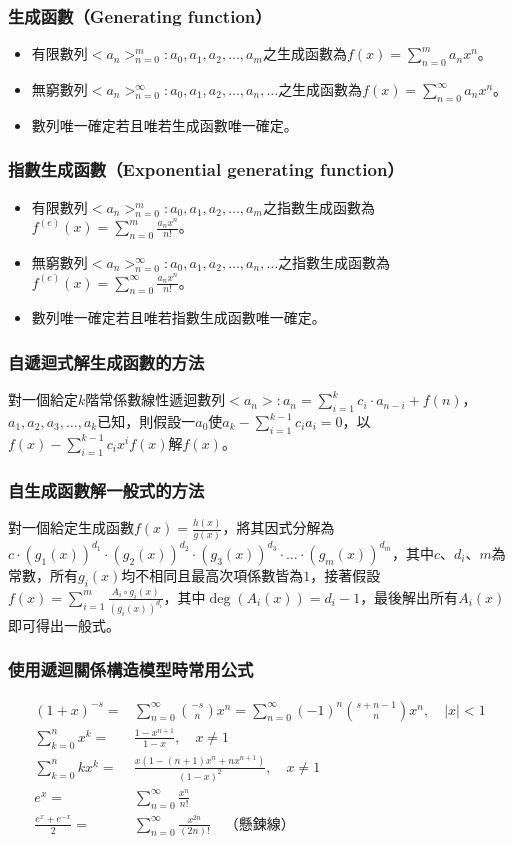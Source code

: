 \documentclass[a4paper,12pt]{article}
\begin{document}
\subsubsection{生成函數（Generating function）}
\begin{itemize}
\item 有限數列$<a_n>_{n=0}^m: a_0, a_1, a_2, \ldots, a_m$之生成函數為$f(x)=\sum_{n=0}^m a_n x^n$。
\item 無窮數列$<a_n>_{n=0}^\infty: a_0, a_1, a_2, \ldots, a_n, \ldots$之生成函數為$f(x)=\sum_{n=0}^\infty a_n x^n$。
\item 數列唯一確定若且唯若生成函數唯一確定。
\end{itemize}
\subsubsection{指數生成函數（Exponential generating function）}
\begin{itemize}
\item 有限數列$<a_n>_{n=0}^m: a_0, a_1, a_2, \ldots, a_m$之指數生成函數為$f^{(e)}(x)=\sum_{n=0}^m \frac{a_n x^n}{n!}$。
\item 無窮數列$<a_n>_{n=0}^\infty: a_0, a_1, a_2, \ldots, a_n, \ldots$之指數生成函數為$f^{(e)}(x)=\sum_{n=0}^\infty \frac{a_n x^n}{n!}$。
\item 數列唯一確定若且唯若指數生成函數唯一確定。
\end{itemize}
\subsubsection{自遞迴式解生成函數的方法}
對一個給定$k$階常係數線性遞迴數列$<a_n>: a_n=\sum_{i=1}^k c_i \cdot a_{n-i} + f(n)$，$a_1, a_2, a_3, \ldots, a_k$已知，則假設一$a_0$使$a_k-\sum_{i=1}^{k-1} c_i a_i=0$，以$f(x)-\sum_{i=1}^{k-1} c_i x^i f(x)$解$f(x)$。
\subsubsection{自生成函數解一般式的方法}
對一個給定生成函數$f(x)=\frac{h(x)}{g(x)}$，將其因式分解為$c\cdot(g_1(x))^{d_1}\cdot(g_2(x))^{d_2}\cdot(g_3(x))^{d_3}\cdot\ldots\cdot(g_m(x))^{d_m}$，其中$c$、$d_i$、$m$為常數，所有$g_i(x)$均不相同且最高次項係數皆為$1$，接著假設$f(x)=\sum_{i=1}^m \frac{A_i\circ g_i(x)}{(g_i(x))^{d_i}}$，其中$\deg(A_i(x))=d_i-1$，最後解出所有$A_i(x)$即可得出一般式。
\subsubsection{使用遞迴關係構造模型時常用公式}
\[
\begin{aligned}
(1+x)^{-s} =& \sum_{n=0}^{\infty}\binom{-s}{n}x^n = \sum_{n=0}^{\infty}(-1)^n\binom{s+n-1}{n}x^n,\quad |x|<1\\
\sum_{k=0}^{n}x^k =& \frac{1-x^{n+1}}{1-x},\quad x\neq 1\\
\sum_{k=0}^{n}kx^k =& \frac{x(1-(n+1)x^n+nx^{n+1})}{(1-x)^2},\quad x\neq 1\\
e^x =& \sum_{n=0}^{\infty} \frac{x^n}{n!} \\
\frac{e^x+e^{-x}}{2} =& \sum_{n=0}^{\infty} \frac{x^{2n}}{(2n)!}\quad\text{（懸鍊線）} \\
\end{aligned}
\]
\end{document}
